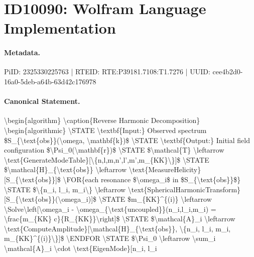 \section*{ID10090: Wolfram Language Implementation}
\paragraph{Metadata.}
PiID: 2325330225763 | RTEID: RTE:P39181.7108:T1.7276 | UUID: cee4b2d0-16a0-5deb-a64b-63d42c176978

\paragraph{Canonical Statement.}
\textbackslash{}begin\{algorithm\} \textbackslash{}caption\{Reverse Harmonic Decomposition\} \textbackslash{}begin\{algorithmic\} \textbackslash{}STATE \textbackslash{}textbf\{Input:\} Observed spectrum \$S\_\{\textbackslash{}text\{obs\}\}(\textbackslash{}omega, \textbackslash{}mathbf\{k\})\$ \textbackslash{}STATE \textbackslash{}textbf\{Output:\} Initial field configuration \$\textbackslash{}Psi\_0(\textbackslash{}mathbf\{r\})\$ \textbackslash{}STATE \$\textbackslash{}mathcal\{T\} \textbackslash{}leftarrow \textbackslash{}text\{GenerateModeTable\}[\textbackslash{}\{n,l,m,n',l',m',m\_\{KK\}\textbackslash{}\}]\$ \textbackslash{}STATE \$\textbackslash{}mathcal\{H\}\_\{\textbackslash{}text\{obs\}\} \textbackslash{}leftarrow \textbackslash{}text\{MeasureHelicity\}[S\_\{\textbackslash{}text\{obs\}\}]\$ \textbackslash{}FOR\{each resonance \$\textbackslash{}omega\_i\$ in \$S\_\{\textbackslash{}text\{obs\}\}\$\} \textbackslash{}STATE \$\textbackslash{}\{n\_i, l\_i, m\_i\textbackslash{}\} \textbackslash{}leftarrow \textbackslash{}text\{SphericalHarmonicTransform\}[S\_\{\textbackslash{}text\{obs\}\}(\textbackslash{}omega\_i)]\$ \textbackslash{}STATE \$m\_\{KK\}\textasciicircum{}\{(i)\} \textbackslash{}leftarrow \textbackslash{}Solve\textbackslash{}left[\textbackslash{}omega\_i - \textbackslash{}omega\_\{\textbackslash{}text\{uncoupled\}\}(n\_i,l\_i,m\_i) = \textbackslash{}frac\{m\_\{KK\} c\}\{R\_\{KK\}\}\textbackslash{}right]\$ \textbackslash{}STATE \$\textbackslash{}mathcal\{A\}\_i \textbackslash{}leftarrow \textbackslash{}text\{ComputeAmplitude\}[\textbackslash{}mathcal\{H\}\_\{\textbackslash{}text\{obs\}\}, \textbackslash{}\{n\_i, l\_i, m\_i, m\_\{KK\}\textasciicircum{}\{(i)\}\textbackslash{}\}]\$ \textbackslash{}ENDFOR \textbackslash{}STATE \$\textbackslash{}Psi\_0 \textbackslash{}leftarrow \textbackslash{}sum\_i \textbackslash{}mathcal\{A\}\_i \textbackslash{}cdot \textbackslash{}text\{EigenMode\}[n\_i, l\_i

